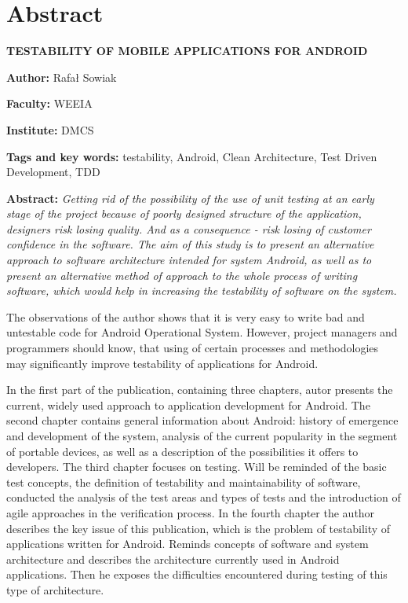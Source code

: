 \chapter{Abstract}
\label{abstract}

\textbf{TESTABILITY OF MOBILE APPLICATIONS FOR ANDROID}

\vspace{20pt}

\textbf{Author:} Rafał Sowiak

\textbf{Faculty:} WEEIA

\textbf{Institute:} DMCS

\textbf{Tags and key words:} testability, Android, Clean Architecture, Test Driven Development, TDD

\textbf{Abstract:} 
\textit{Getting rid of the possibility of the use of unit testing at an early stage of the project because of poorly designed structure of the application, designers risk losing quality. And as a consequence - risk losing of customer confidence in the software. The aim of this study is to present an alternative approach to software architecture intended for system Android, as well as to present an alternative method of approach to the whole process of writing software, which would help in increasing the testability of software on the system.}

The observations of the author shows that it is very easy to write bad and untestable code for Android Operational System. However, project managers and programmers should know, that using of certain processes and methodologies may significantly improve testability of applications for Android.

In the first part of the publication, containing three chapters, autor presents the current, widely used approach to application development for Android. The second chapter contains general information about Android: history of emergence and development of the system, analysis of the current popularity in the segment of portable devices, as well as a description of the possibilities it offers to developers. The third chapter focuses on testing. Will be reminded of the basic test concepts, the definition of testability and maintainability of software, conducted the analysis of the test areas and types of tests and the introduction of agile approaches in the verification process. In the fourth chapter the author describes the key issue of this publication, which is the problem of testability of applications written for Android. Reminds concepts of software and system architecture and describes the architecture currently used in Android applications. Then he exposes the difficulties encountered during testing of this type of architecture.

